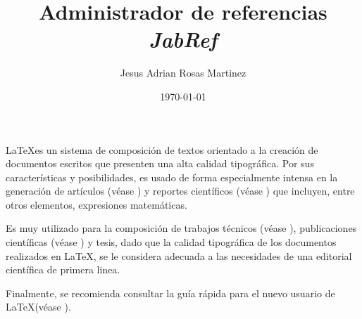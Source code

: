 \documentclass[12pt]{article}
\title{Administrador de referencias \emph{JabRef}}
\author{Jesus Adrian Rosas Martinez}
\date{\small{\today}}
\begin{document}
\maketitle %

\LaTeX es un sistema de composición de textos orientado a la creación de documentos escritos que presenten una alta calidad tipográfica. Por sus características y posibilidades, es usado de forma especialmente intensa en la generación de artículos (véase \cite{li1975bases}) y reportes científicos (véase \cite{zuber1959hydrodynamic}) que incluyen, entre otros elementos, expresiones matemáticas.

Es muy utilizado para la composición de trabajos técnicos (véase \cite{gianturco2012migracion}), publicaciones científicas (véase \cite{alarcon2010publicaciones}) y tesis, dado que la calidad tipográfica de los documentos realizados en \LaTeX, se le considera adecuada a las necesidades de una editorial científica de primera linea.

Finalmente, se recomienda consultar la guía rápida para el nuevo usuario de \LaTeX (véase \cite{martel2004guia}).

\renewcommand{\bibname}{Referencias}

\nocite{Conway, Honold, Ling, Pless, Qian}

\end{document}
